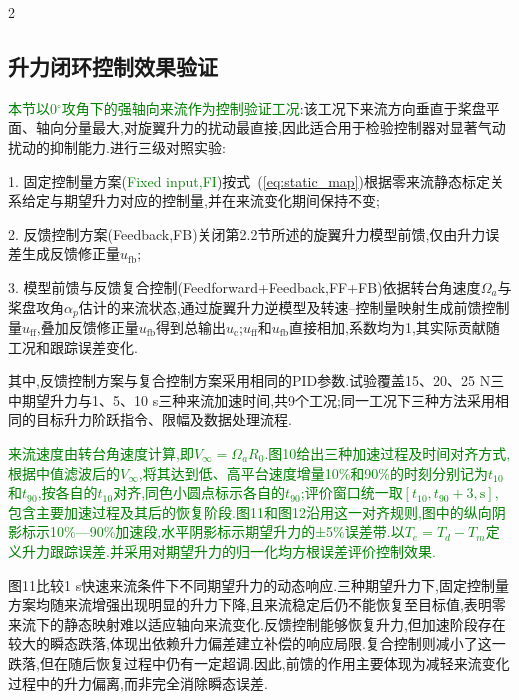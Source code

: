 \documentclass{aas}
\begin{document}
\begin{multicols}{2}
    
\subsection{升力闭环控制效果验证}
\label{subsec:control_verif}

\textcolor{green}{本节以0$^{\circ}$攻角下的强轴向来流作为控制验证工况}:该工况下来流方向垂直于桨盘平面、轴向分量最大,对旋翼升力的扰动最直接,因此适合用于检验控制器对显著气动扰动的抑制能力.进行三级对照实验:

1. 固定控制量方案(\textcolor{green}{Fixed input,FI})按式~(\ref{eq:static_map})根据零来流静态标定关系给定与期望升力对应的控制量,并在来流变化期间保持不变;

2. 反馈控制方案(Feedback,FB)关闭第2.2节所述的旋翼升力模型前馈,仅由升力误差生成反馈修正量$u_{\mathrm{fb}}$;

3. 模型前馈与反馈复合控制(Feedforward+Feedback,FF+FB)依据转台角速度$\Omega_a$与桨盘攻角$\alpha_p$估计的来流状态,通过旋翼升力逆模型及转速--控制量映射生成前馈控制量$u_{\mathrm{ff}}$,叠加反馈修正量$u_{\mathrm{fb}}$得到总输出$u_{\mathrm{c}}$;$u_{\mathrm{ff}}$和$u_{\mathrm{fb}}$直接相加,系数均为1,其实际贡献随工况和跟踪误差变化.

其中,反馈控制方案与复合控制方案采用相同的PID参数.试验覆盖15、20、25 N三中期望升力与1、5、10 s三种来流加速时间,共9个工况;同一工况下三种方法采用相同的目标升力阶跃指令、限幅及数据处理流程.

\textcolor{green}{来流速度由转台角速度计算,即$V_\infty=\Omega_a R_0$.图10给出三种加速过程及时间对齐方式,根据中值滤波后的$V_\infty$,将其达到低、高平台速度增量10\%和90\%的时刻分别记为$t_{10}$和$t_{90}$,按各自的$t_{10}$对齐,同色小圆点标示各自的$t_{90}$;评价窗口统一取$[t_{10},t_{90}+3,\mathrm{s}]$,包含主要加速过程及其后的恢复阶段.图11和图12沿用这一对齐规则,图中的纵向阴影标示10\%—90\%加速段,水平阴影标示期望升力的±5\%误差带.以$T_e=T_d-T_m$定义升力跟踪误差.并采用对期望升力的归一化均方根误差评价控制效果.}

图11比较1 s快速来流条件下不同期望升力的动态响应.三种期望升力下,固定控制量方案均随来流增强出现明显的升力下降,且来流稳定后仍不能恢复至目标值,表明零来流下的静态映射难以适应轴向来流变化.反馈控制能够恢复升力,但加速阶段存在较大的瞬态跌落,体现出依赖升力偏差建立补偿的响应局限.复合控制则减小了这一跌落,但在随后恢复过程中仍有一定超调.因此,前馈的作用主要体现为减轻来流变化过程中的升力偏离,而非完全消除瞬态误差.

\end{multicols}
\end{document}
